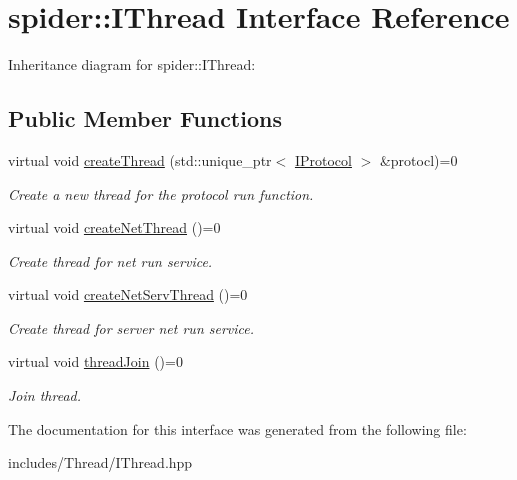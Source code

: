 \hypertarget{classspider_1_1_i_thread}{}\section{spider\+:\+:I\+Thread Interface Reference}
\label{classspider_1_1_i_thread}


Inheritance diagram for spider\+:\+:I\+Thread\+:
\subsection*{Public Member Functions}
\begin{DoxyCompactItemize}
\item 
\mbox{\label{classspider_1_1_i_thread_a1fe8cb13aa5aa46ad5368e64ba850dc3}} 
virtual void \hyperlink{classspider_1_1_i_thread_a1fe8cb13aa5aa46ad5368e64ba850dc3}{create\+Thread} (std\+::unique\+\_\+ptr$<$ \hyperlink{classspider_1_1_i_protocol}{I\+Protocol} $>$ \&protocl)=0
\begin{DoxyCompactList}\small\item\em Create a new thread for the protocol run function. \end{DoxyCompactList}\item 
\mbox{\label{classspider_1_1_i_thread_a5419f2562c74a22646b339c827c00005}} 
virtual void \hyperlink{classspider_1_1_i_thread_a5419f2562c74a22646b339c827c00005}{create\+Net\+Thread} ()=0
\begin{DoxyCompactList}\small\item\em Create thread for net run service. \end{DoxyCompactList}\item 
\mbox{\label{classspider_1_1_i_thread_ae098f50dbd14c5b50229b95040bea753}} 
virtual void \hyperlink{classspider_1_1_i_thread_ae098f50dbd14c5b50229b95040bea753}{create\+Net\+Serv\+Thread} ()=0
\begin{DoxyCompactList}\small\item\em Create thread for server net run service. \end{DoxyCompactList}\item 
\mbox{\label{classspider_1_1_i_thread_a20f8101a7e96b853e5810f2978979070}} 
virtual void \hyperlink{classspider_1_1_i_thread_a20f8101a7e96b853e5810f2978979070}{thread\+Join} ()=0
\begin{DoxyCompactList}\small\item\em Join thread. \end{DoxyCompactList}\end{DoxyCompactItemize}


The documentation for this interface was generated from the following file\+:\begin{DoxyCompactItemize}
\item 
includes/\+Thread/I\+Thread.\+hpp\end{DoxyCompactItemize}
